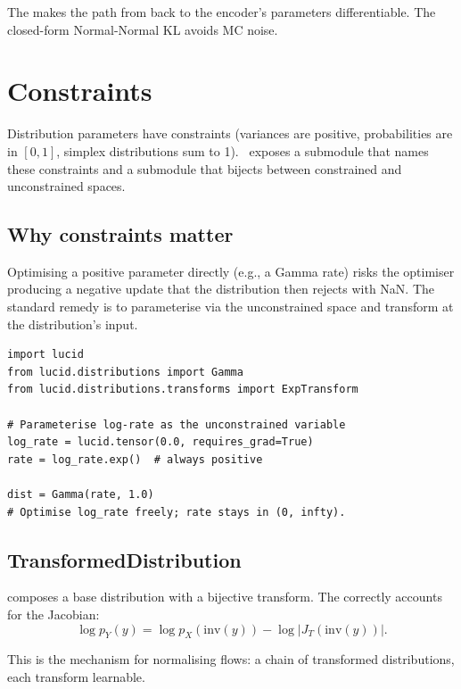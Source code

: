 The  makes the path from  back to the
encoder's parameters differentiable. The closed-form
Normal-Normal KL avoids MC noise.

\section{Constraints}
\label{sec:distributions:constraints}

Distribution parameters have constraints (variances are positive,
probabilities are in $[0, 1]$, simplex distributions sum to 1).
\Lucid\ exposes a  submodule that names these
constraints and a  submodule that bijects
between constrained and unconstrained spaces.

\subsection{Why constraints matter}
\label{ssec:distributions:why_constraints}

Optimising a positive parameter directly (e.g., a Gamma rate)
risks the optimiser producing a negative update that the
distribution then rejects with NaN. The standard remedy is to
parameterise via the unconstrained space and transform at the
distribution's input.

\begin{lstlisting}[style=lucid,language=LucidPython]
import lucid
from lucid.distributions import Gamma
from lucid.distributions.transforms import ExpTransform

# Parameterise log-rate as the unconstrained variable
log_rate = lucid.tensor(0.0, requires_grad=True)
rate = log_rate.exp()  # always positive

dist = Gamma(rate, 1.0)
# Optimise log_rate freely; rate stays in (0, infty).
\end{lstlisting}

\subsection{TransformedDistribution}
\label{ssec:distributions:transformed}

 composes a base
distribution with a bijective transform. The
 correctly accounts for the Jacobian:
\[
\log p_Y(y) = \log p_X(\text{inv}(y)) - \log |J_{T}(\text{inv}(y))|.
\]

This is the mechanism for normalising flows: a chain of
transformed distributions, each transform learnable.

